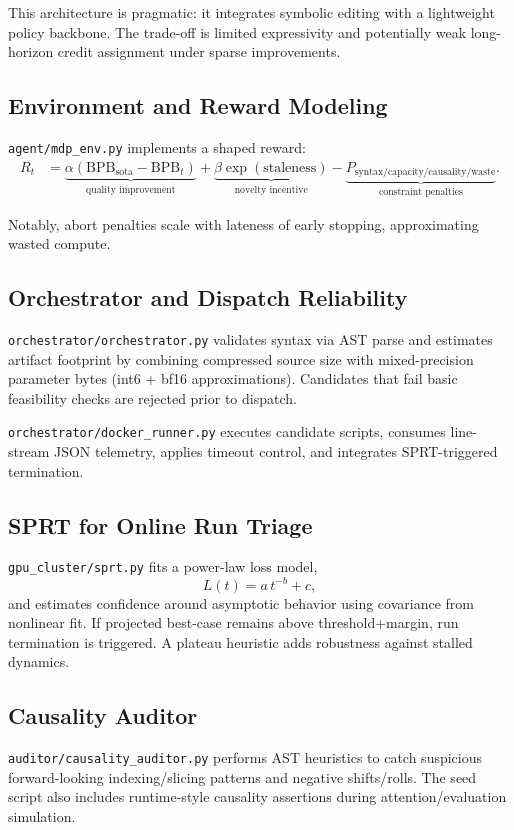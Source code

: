 \documentclass[11pt]{article}
\begin{document}
This architecture is pragmatic: it integrates symbolic editing with a lightweight policy backbone. The trade-off is limited expressivity and potentially weak long-horizon credit assignment under sparse improvements.

\subsection{Environment and Reward Modeling}
\texttt{agent/mdp\_env.py} implements a shaped reward:
\begin{align}
R_t &= \underbrace{\alpha(\mathrm{BPB}_{\text{sota}}-\mathrm{BPB}_t)}_{\text{quality improvement}}
+ \underbrace{\beta \exp(\text{staleness})}_{\text{novelty incentive}}
- \underbrace{P_{\text{syntax/capacity/causality/waste}}}_{\text{constraint penalties}}.
\end{align}

Notably, abort penalties scale with lateness of early stopping, approximating wasted compute.

\subsection{Orchestrator and Dispatch Reliability}
\texttt{orchestrator/orchestrator.py} validates syntax via AST parse and estimates artifact footprint by combining compressed source size with mixed-precision parameter bytes (int6 + bf16 approximations). Candidates that fail basic feasibility checks are rejected prior to dispatch.

\texttt{orchestrator/docker\_runner.py} executes candidate scripts, consumes line-stream JSON telemetry, applies timeout control, and integrates SPRT-triggered termination.

\subsection{SPRT for Online Run Triage}
\texttt{gpu\_cluster/sprt.py} fits a power-law loss model,
\begin{equation}
L(t) = a\, t^{-b} + c,
\end{equation}
and estimates confidence around asymptotic behavior using covariance from nonlinear fit. If projected best-case remains above threshold+margin, run termination is triggered. A plateau heuristic adds robustness against stalled dynamics.

\subsection{Causality Auditor}
\texttt{auditor/causality\_auditor.py} performs AST heuristics to catch suspicious forward-looking indexing/slicing patterns and negative shifts/rolls. The seed script also includes runtime-style causality assertions during attention/evaluation simulation.
\end{document}
